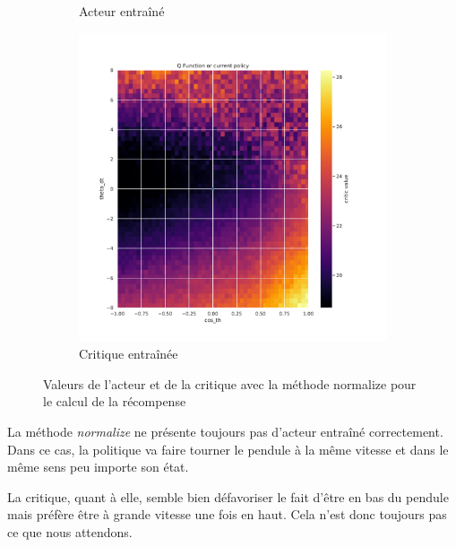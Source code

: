 \begin{figure}[H]
\begin{subfigure}{0.3\textwidth}
        \caption{Acteur entraîné}
    \end{subfigure}
    \begin{subfigure}{0.3\textwidth}
        \includegraphics[width=\textwidth]{figures/iteration3/0_critic_normalize_post_Pendulum-v0.pdf}
        \caption{Critique entraînée}
    \end{subfigure}
    \caption{Valeurs de l'acteur et de la critique avec la méthode normalize pour le calcul de la récompense}
    \label{fig:itr3_normalize}
\end{figure}

La méthode \emph{normalize} ne présente toujours pas d'acteur entraîné correctement. Dans ce cas, la politique va faire tourner le pendule à la même vitesse et dans le même sens peu importe son état.

La critique, quant à elle, semble bien défavoriser le fait d'être en bas du pendule mais préfère être à grande vitesse une fois en haut. Cela n'est donc toujours pas ce que nous attendons.